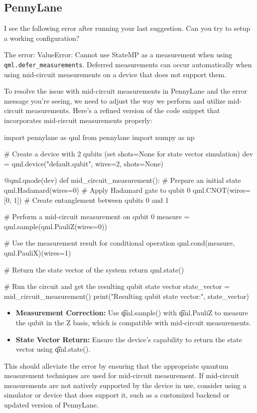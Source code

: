 \subsection{PennyLane}

\begin{ai}
I see the following error after running your last suggestion. Can you try to setup a working
configuration?

The error:
ValueError: Cannot use StateMP as a measurement when using \verb|qml.defer_measurements|. Deferred
measurements can occur automatically when using mid-circuit measurements on a device that does not
support them.
\end{ai}

\begin{airesult}
To resolve the issue with mid-circuit measurements in PennyLane and the error message you're seeing,
we need to adjust the way we perform and utilize mid-circuit measurements. Here's a refined version
of the code snippet that incorporates mid-circuit measurements properly:

\begin{python}
import pennylane as qml
from pennylane import numpy as np

# Create a device with 2 qubits (set shots=None for state vector simulation)
dev = qml.device("default.qubit", wires=2, shots=None)

@qml.qnode(dev)
def mid_circuit_measurement():
    # Prepare an initial state
    qml.Hadamard(wires=0)  # Apply Hadamard gate to qubit 0
    qml.CNOT(wires=[0, 1]) # Create entanglement between qubits 0 and 1

    # Perform a mid-circuit measurement on qubit 0
    measure = qml.sample(qml.PauliZ(wires=0))

    # Use the measurement result for conditional operation
    qml.cond(measure, qml.PauliX)(wires=1)

    # Return the state vector of the system
    return qml.state()

# Run the circuit and get the resulting qubit state vector
state_vector = mid_circuit_measurement()
print("Resulting qubit state vector:", state_vector)
\end{python}

\begin{itemize}
  \item \textbf{Measurement Correction:} Use \t{qml.sample()} with \t{qml.PauliZ} to measure the
        qubit in the Z basis, which is compatible with mid-circuit measurements.

  \item \textbf{State Vector Return:} Ensure the device's capability to return the state vector
        using \t{qml.state()}.
\end{itemize}

This should alleviate the error by ensuring that the appropriate quantum measurement techniques are
used for mid-circuit measurement. If mid-circuit measurements are not natively supported by the
device in use, consider using a simulator or device that does support it, such as a customized
backend or updated version of PennyLane.
\end{airesult}

